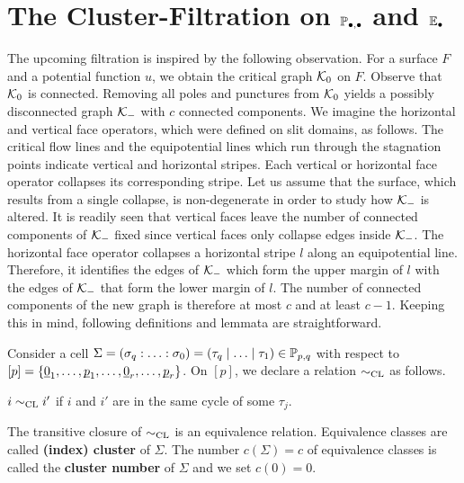 \section{The Cluster-Filtration on \texorpdfstring{$\mathbb P_{\bullet, \bullet}$}{P} and \texorpdfstring{$\mathbb E_\bullet$}{E}}
The upcoming filtration is inspired by the following observation.
For a surface $F$ and a potential function $u$, we obtain the critical graph $\mathcal{K}_0$ on $F$.
Observe that $\mathcal{K}_0$ is connected.
Removing all poles and punctures from $\mathcal{K}_0$ yields a possibly disconnected graph $\mathcal{K}_-$ with $c$ connected components.
We imagine the horizontal and vertical face operators, which were defined on slit domains, as follows.
The critical flow lines and the equipotential lines which run through the stagnation points indicate vertical and horizontal stripes.
Each vertical or horizontal face operator collapses its corresponding stripe.
Let us assume that the surface, which results from a single collapse, is non-degenerate in order to study how $\mathcal{K}_-$ is altered.
It is readily seen that vertical faces leave the number of connected components of $\mathcal{K}_-$ fixed since vertical faces only collapse edges inside $\mathcal{K}_-$.
The horizontal face operator collapses a horizontal stripe $l$ along an equipotential line.
Therefore, it identifies the edges of $\mathcal{K}_-$ which form the upper margin of $l$ with the edges of $\mathcal{K}_-$ that form the lower margin of $l$.
The number of connected components of the new graph is therefore at most $c$ and at least $c-1$.
Keeping this in mind, following definitions and lemmata are straightforward.
\begin{defi}
    \label{css:cluster_relation}
    Consider a cell $ \Sigma = \homogq = \inhomq \in \PP_{p,q}$ with respect to $[p] = \{ \ul0_1, \ldots, \ul p_1, \ldots, \ul 0_r, \ldots, \ul p_r\}$. 
    On $[p]$, we declare a relation $\sim_{\mathrm{CL}}$ as follows.
    \begin{center}
        $i \sim_{\mathrm{CL}} i'$ \hspace{10pt} if \hspace{10pt} $i$ and $i'$ are in the same cycle of some $\tau_j$. 
    \end{center}
    The transitive closure of $\sim_{\mathrm{CL}}$ is an equivalence relation.
    Equivalence classes are called {\bf (index) cluster} of $\Sigma$.
    The number $c(\Sigma) = c$ of equivalence classes is called the {\bf cluster number} of $\Sigma$ and we set $c(0) = 0$. 
\end{defi}

